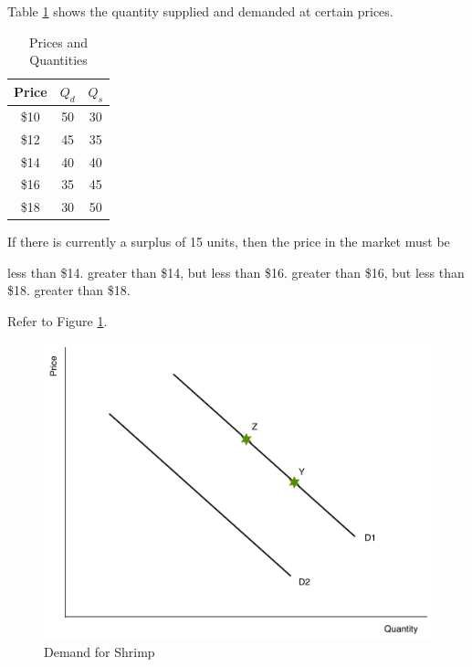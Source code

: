 \documentclass[addpoints,11pt]{exam}
\theoremstyle{definition}
\begin{document}
\begin{questions}
	
		
\question Table \ref{MC17} shows the quantity supplied and demanded at certain prices.


\begin{table}[h!]
	\caption{Prices and Quantities}
	\centering
	\begin{tabular}{  c | c | c} 
		
		Price & $Q_d$ & $Q_s$ \\
		\hline
		\$10 & 50 & 30 \\
		\$12 & 45 & 35 \\
		\$14 & 40 & 40 \\
		\$16 & 35 & 45 \\
		\$18 & 30 & 50 \\
	\end{tabular}
	\label{MC17}
\end{table}

If there is currently a surplus of 15 units, then the price in the market must be

\begin{choices}
	\choice less than \$14.
	\choice greater than \$14, but less than \$16.
	\CorrectChoice greater than \$16, but less than \$18.
	\choice greater than \$18.
\end{choices}

\newpage		
	

\question Refer to Figure \ref{MC2}.


\begin{figure}[H]
	\centering
	\includegraphics[scale=.40]{Exam1_MC2.pdf}
	\caption{Demand for Shrimp}
	\label{MC2}
\end{figure}


\end{questions}
\end{document}
